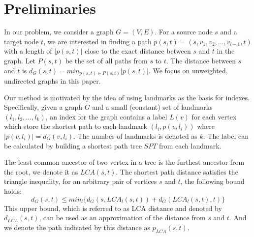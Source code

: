 \section{Preliminaries}
\label{preliminary}

In our problem, we consider a graph $G = (V,E)$. For a source node $s$ and a target node $t$, we are interested in finding a path $p(s,t)=(s,v_1,v_2,...,v_{l-1},t)$ with a length of $|p(s,t)|$ close to the exact distance between $s$ and $t$ in the graph. Let $P(s,t)$ be the set of all paths from $s$ to $t$. The distance between $s$ and $t$ is $d_G(s,t) = min_{p(s,t) \in P(s,t)}|p(s,t)|$. We focus on unweighted, undirected graphs in this paper.


Our method is motivated by the idea of using landmarks as the basis for indexes. Specifically, given a graph $G$ and a small (constant) set of landmarks $(l_1,l_2,...,l_k)$, an index for the graph contains a label $L(v)$ for each vertex which store the shortest path to each landmark $(l_i, p(v,l_i))$ where $|p(v,l_i)| = d_G(v,l_i)$. The number of landmarks is denoted as $k$. The label can be calculated by building a shortest path tree $SPT$ from each landmark.


The least common ancestor of two vertex in a tree is the furthest ancestor from the root, we denote it as $LCA(s,t)$. The shortest path distance satisfies the triangle inequality, for an arbitrary pair of vertices $s$ and $t$, the following bound holds:
\begin{equation}
\label{equ:upper}
    d_G(s,t) \leq min_{l}\{d_G(s,LCA_{l}(s,t)) + d_G(LCA_{l}(s,t),t)\}
\end{equation}
This upper bound, which is referred to as LCA distance and denoted by $d_{LCA}(s,t)$, can be used as an approximation of the distance from $s$ and $t$. And we denote the path indicated by this distance as $p_{LCA}(s,t)$.